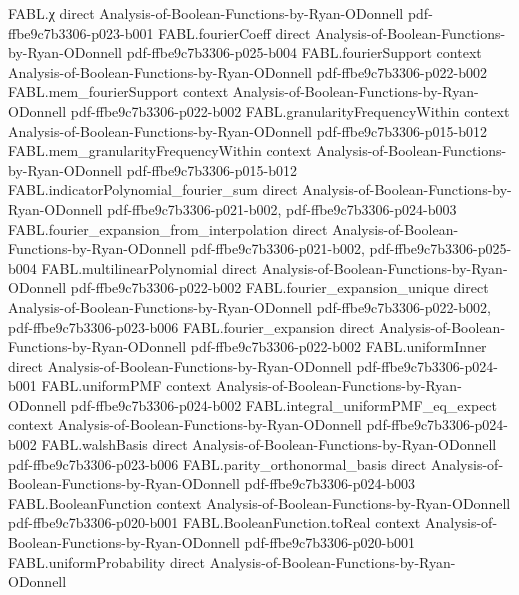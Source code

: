 \begin{theorem}
\proofstep
  {FABL.χ}
  {direct}
  {Analysis-of-Boolean-Functions-by-Ryan-ODonnell}
  {pdf-ffbe9c7b3306-p023-b001}
\proofstep
  {FABL.fourierCoeff}
  {direct}
  {Analysis-of-Boolean-Functions-by-Ryan-ODonnell}
  {pdf-ffbe9c7b3306-p025-b004}
\proofstep
  {FABL.fourierSupport}
  {context}
  {Analysis-of-Boolean-Functions-by-Ryan-ODonnell}
  {pdf-ffbe9c7b3306-p022-b002}
\proofstep
  {FABL.mem_fourierSupport}
  {context}
  {Analysis-of-Boolean-Functions-by-Ryan-ODonnell}
  {pdf-ffbe9c7b3306-p022-b002}
\proofstep
  {FABL.granularityFrequencyWithin}
  {context}
  {Analysis-of-Boolean-Functions-by-Ryan-ODonnell}
  {pdf-ffbe9c7b3306-p015-b012}
\proofstep
  {FABL.mem_granularityFrequencyWithin}
  {context}
  {Analysis-of-Boolean-Functions-by-Ryan-ODonnell}
  {pdf-ffbe9c7b3306-p015-b012}
\proofstep
  {FABL.indicatorPolynomial_fourier_sum}
  {direct}
  {Analysis-of-Boolean-Functions-by-Ryan-ODonnell}
  {pdf-ffbe9c7b3306-p021-b002,
    pdf-ffbe9c7b3306-p024-b003}
\proofstep
  {FABL.fourier_expansion_from_interpolation}
  {direct}
  {Analysis-of-Boolean-Functions-by-Ryan-ODonnell}
  {pdf-ffbe9c7b3306-p021-b002,
    pdf-ffbe9c7b3306-p025-b004}
\proofstep
  {FABL.multilinearPolynomial}
  {direct}
  {Analysis-of-Boolean-Functions-by-Ryan-ODonnell}
  {pdf-ffbe9c7b3306-p022-b002}
\proofstep
  {FABL.fourier_expansion_unique}
  {direct}
  {Analysis-of-Boolean-Functions-by-Ryan-ODonnell}
  {pdf-ffbe9c7b3306-p022-b002,
    pdf-ffbe9c7b3306-p023-b006}
\proofstep
  {FABL.fourier_expansion}
  {direct}
  {Analysis-of-Boolean-Functions-by-Ryan-ODonnell}
  {pdf-ffbe9c7b3306-p022-b002}
\proofstep
  {FABL.uniformInner}
  {direct}
  {Analysis-of-Boolean-Functions-by-Ryan-ODonnell}
  {pdf-ffbe9c7b3306-p024-b001}
\proofstep
  {FABL.uniformPMF}
  {context}
  {Analysis-of-Boolean-Functions-by-Ryan-ODonnell}
  {pdf-ffbe9c7b3306-p024-b002}
\proofstep
  {FABL.integral_uniformPMF_eq_expect}
  {context}
  {Analysis-of-Boolean-Functions-by-Ryan-ODonnell}
  {pdf-ffbe9c7b3306-p024-b002}
\proofstep
  {FABL.walshBasis}
  {direct}
  {Analysis-of-Boolean-Functions-by-Ryan-ODonnell}
  {pdf-ffbe9c7b3306-p023-b006}
\proofstep
  {FABL.parity_orthonormal_basis}
  {direct}
  {Analysis-of-Boolean-Functions-by-Ryan-ODonnell}
  {pdf-ffbe9c7b3306-p024-b003}
\proofstep
  {FABL.BooleanFunction}
  {context}
  {Analysis-of-Boolean-Functions-by-Ryan-ODonnell}
  {pdf-ffbe9c7b3306-p020-b001}
\proofstep
  {FABL.BooleanFunction.toReal}
  {context}
  {Analysis-of-Boolean-Functions-by-Ryan-ODonnell}
  {pdf-ffbe9c7b3306-p020-b001}
\proofstep
  {FABL.uniformProbability}
  {direct}
  {Analysis-of-Boolean-Functions-by-Ryan-ODonnell}

\end{theorem}
